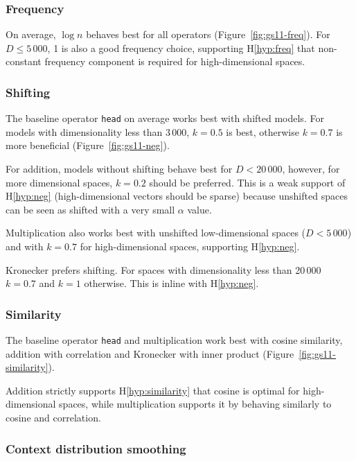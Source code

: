 \subsubsection{Frequency}


On average, $\log n$ behaves best for all operators (Figure~\ref{fig:gs11-freq}). For $D \leq 5\,000$, 1 is also a good frequency choice, supporting H\ref{hyp:freq} that non-constant frequency component is required for high-dimensional spaces.

\subsubsection{Shifting}

The baseline operator \texttt{head} on average works best with shifted models. For models with dimensionality less than 3\,000, $k = 0.5$ is best, otherwise $k = 0.7$ is more beneficial (Figure~\ref{fig:gs11-neg}).

For addition, models without shifting behave best for $D < 20\,000$, however, for more dimensional spaces, $k = 0.2$ should be preferred. This is a weak support of H\ref{hyp:neg} (high-dimensional vectors should be sparse) because unshifted spaces can be seen as shifted with a very small $\alpha$ value.

Multiplication also works best with unshifted low-dimensional spaces ($D < 5\,000$) and with $k = 0.7$ for high-dimensional spaces, supporting H\ref{hyp:neg}.

Kronecker prefers shifting. For spaces with dimensionality less than 20\,000 $k = 0.7$ and $k = 1$ otherwise. This is inline with H\ref{hyp:neg}.



\subsubsection{Similarity}

The baseline operator \texttt{head} and multiplication work best with cosine similarity, addition with correlation and Kronecker with inner product (Figure~\ref{fig:gs11-similarity}).

Addition strictly supports H\ref{hyp:similarity} that cosine is optimal for high-dimensional spaces, while multiplication supports it by behaving similarly to cosine and correlation.

\subsubsection{Context distribution smoothing}

